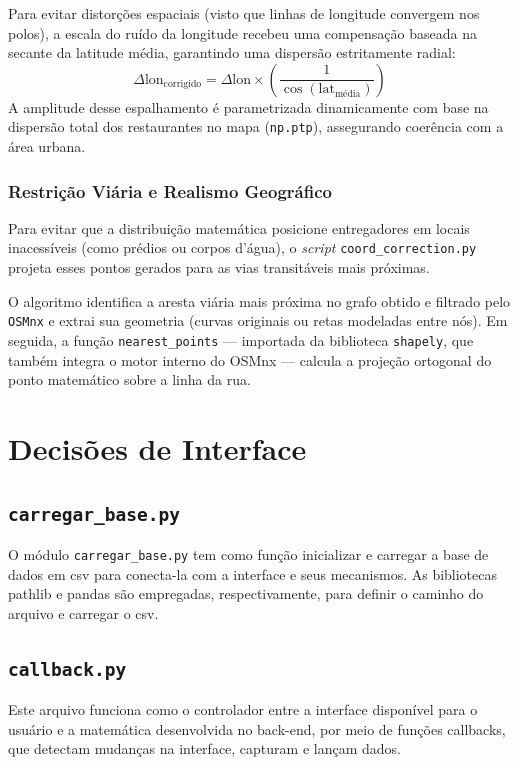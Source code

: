\documentclass[12pt,a4paper]{article}
\begin{document}
Para evitar distorções espaciais (visto que linhas de longitude convergem nos polos), a escala do ruído da longitude recebeu uma compensação baseada na secante da latitude média, garantindo uma dispersão estritamente radial:
\[
    \Delta\text{lon}_{\text{corrigido}} = \Delta\text{lon} \times \left(\frac{1}{\cos(\text{lat}_{\text{média}})}\right)
\]
A amplitude desse espalhamento é parametrizada dinamicamente com base na dispersão total dos restaurantes no mapa (\texttt{np.ptp}), assegurando coerência com a área urbana.

\subsubsection{Restrição Viária e Realismo Geográfico}
Para evitar que a distribuição matemática posicione entregadores em locais inacessíveis (como prédios ou corpos d'água), o \textit{script} \texttt{coord\_correction.py} projeta esses pontos gerados para as vias transitáveis mais próximas. 

O algoritmo identifica a aresta viária mais próxima no grafo obtido e filtrado pelo \texttt{OSMnx} e extrai sua geometria (curvas originais ou retas modeladas entre nós). Em seguida, a função \texttt{nearest\_points} — importada da biblioteca \texttt{shapely}, que também integra o motor interno do OSMnx — calcula a projeção ortogonal do ponto matemático sobre a linha da rua. 
\section{Decisões de Interface}

\subsection{\texttt{carregar\_base.py}}

O módulo \texttt{carregar\_base.py} tem como função inicializar e carregar a base de dados em csv para conecta-la com a interface e seus mecanismos. As bibliotecas pathlib e pandas são empregadas, respectivamente, para definir o caminho do arquivo e carregar o csv.

\subsection{\texttt{callback.py}}

Este arquivo funciona como o controlador entre a interface disponível para o usuário e a matemática desenvolvida no back-end, por meio de funções callbacks, que detectam mudanças na interface, capturam e lançam dados.
\end{document}
